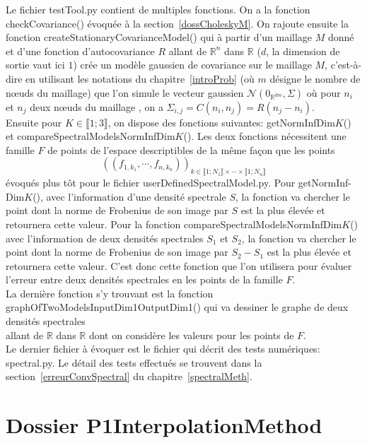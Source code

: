 Le fichier testTool.py contient de multiples fonctions. On a la fonction checkCovariance() évoquée à la section~\ref{dossCholeskyM}.
On rajoute ensuite la fonction createStationaryCovarianceModel() qui à partir d'un maillage $M$ donné et d'une
fonction d'autocovariance $R$ allant de $\mathbb{R}^{n}$ dans $\mathbb{R}$ ($d$, la dimension de sortie vaut ici $1$)
crée un modèle gaussien de covariance sur le maillage $M$, c'est-à-dire en utilisant les notations du
chapitre~\ref{introProb} (où $m$ désigne le nombre de n\oe uds du maillage) que l'on simule
le vecteur gaussien $\mathcal{N}(0_{\mathbb{R}^{dm}},\Sigma)$ où pour $n_i$ et $n_j$ deux n\oe uds du maillage
, on a $\Sigma_{i,j} = C(n_i,n_j) = R(n_j - n_i)$.\\
Ensuite pour $K \in \llbracket 1;3 \rrbracket$,
on dispose des fonctions suivantes:  getNormInfDim$K$() et compareSpectralModelsNormInfDim$K$().
Les deux fonctions nécessitent une famille $F$ de points de l'espace descriptibles de la
même façon que les points \begin{equation*} ((f_{1,k_1}, \cdots, f_{n,k_n}))_{ k \in \llbracket 1;N_1 \rrbracket \times \cdots \times \llbracket 1;N_n \rrbracket} \end{equation*}
évoqués plus tôt pour le fichier userDefinedSpectralModel.py. Pour getNormInf-
Dim$K$(),
avec l'information d'une densité spectrale $S$, la fonction va chercher le point dont la norme de Frobenius de
son image par $S$ est la plus élevée et retournera cette valeur. Pour la fonction compareSpectralModelsNormInfDim$K$() avec l'information de deux densités
spectrales $S_1$ et $S_2$, la fonction va chercher le point dont la norme de Frobenius de
son image par $S_2 - S_1$ est la plus élevée et retournera cette valeur. C'est donc cette
fonction que l'on utilisera pour évaluer l'erreur entre deux densités spectrales en les points de la famille $F$.\\
La dernière fonction s'y trouvant est la fonction graphOfTwoModelsInputDim1OutputDim1() qui va dessiner
le graphe de deux densités spectrales \\allant de $\mathbb{R}$ dans $\mathbb{R}$ dont on considère
les valeurs pour les points de $F$.\\

Le dernier fichier à évoquer est le fichier qui décrit des tests numériques:
spectral.py. Le détail des tests effectués se trouvent dans la section~\ref{erreurConvSpectral}
du chapitre~\ref{spectralMeth}.


\section{Dossier P1InterpolationMethod}

